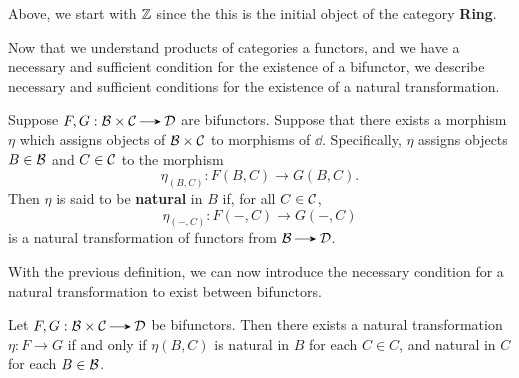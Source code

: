 \begin{example}
\begin{center}
        \end{center}
        Above, we start with $\mathbb{Z}$ since the this is the initial object of the category 
        \textbf{Ring}. 
    \end{example}
    

    Now that we understand products of categories a functors, and we
    have a necessary and sufficient condition for the existence of a
    bifunctor, we describe necessary and sufficient conditions for the
    existence of a natural transformation.

    \begin{definition}
        Suppose $F, G: \bb \times \cc \to \dd$ are bifunctors. Suppose
        that there exists a morphism $\eta$ which assigns objects of $\mathcal{B}
        \times \mathcal{C}$ to morphisms of $\dd$. Specifically, $\eta$ assigns
        objects
        $B \in \mathcal{B}$ and $C \in \mathcal{C}$ to the morphism 
        \[
            \eta_{(B, C)} : F(B, C) \to G(B, C).
        \]
        Then $\eta$ is said to be \textbf{natural} in $B$ if, for all
        $C \in \mathcal{C}$, 
        \[
            \eta_{(-, C)} : F(-, C) \to G(-, C)
        \]
        is a natural transformation of functors from $\bb \to \dd$. 
    \end{definition} 

    With the previous definition, we can now introduce the necessary
    condition for a natural transformation to exist between bifunctors.
    
    \begin{proposition}\label{prop_bifunctors}
        Let $F, G: \bb \times \cc \to \dd$ be bifunctors. Then there
        exists a natural transformation $\eta: F \to G$ if and only if
        $\eta(B, C)$ is natural in $B$ for each $C \in C$, and natural
        in $C$ for each $B \in \mathcal{B}$.
    \end{proposition}

